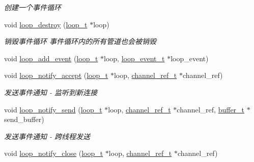\begin{DoxyCompactItemize}
\begin{DoxyCompactList}\small\item\em 创建一个事件循环 \end{DoxyCompactList}\item 
void \hyperlink{a00094_ga921fd5e5e16a73de123e81baab187a0a_ga921fd5e5e16a73de123e81baab187a0a}{loop\+\_\+destroy} (\hyperlink{a00047_a9c3ad1cd2de83e09f3a7b59fa82c94ee_a9c3ad1cd2de83e09f3a7b59fa82c94ee}{loop\+\_\+t} $\ast$loop)
\begin{DoxyCompactList}\small\item\em 销毁事件循环 事件循环内的所有管道也会被销毁 \end{DoxyCompactList}\item 
void \hyperlink{a00062_a1697e4a52238e6e4512caac6c34b9abb_a1697e4a52238e6e4512caac6c34b9abb}{loop\+\_\+add\+\_\+event} (\hyperlink{a00047_a9c3ad1cd2de83e09f3a7b59fa82c94ee_a9c3ad1cd2de83e09f3a7b59fa82c94ee}{loop\+\_\+t} $\ast$loop, \hyperlink{a00062_a1095ee772017ce29dcac0987c456709e_a1095ee772017ce29dcac0987c456709e}{loop\+\_\+event\+\_\+t} $\ast$loop\+\_\+event)
\item 
void \hyperlink{a00062_a61e9eb6eeaaad4d1d655beba05bb8440_a61e9eb6eeaaad4d1d655beba05bb8440}{loop\+\_\+notify\+\_\+accept} (\hyperlink{a00047_a9c3ad1cd2de83e09f3a7b59fa82c94ee_a9c3ad1cd2de83e09f3a7b59fa82c94ee}{loop\+\_\+t} $\ast$loop, \hyperlink{a00047_a151271c9d188ef28d4d24bb81dcc1263_a151271c9d188ef28d4d24bb81dcc1263}{channel\+\_\+ref\+\_\+t} $\ast$channel\+\_\+ref)
\begin{DoxyCompactList}\small\item\em 发送事件通知 -\/ 监听到新连接 \end{DoxyCompactList}\item 
void \hyperlink{a00062_ad023112870f736a601137129420a94b9_ad023112870f736a601137129420a94b9}{loop\+\_\+notify\+\_\+send} (\hyperlink{a00047_a9c3ad1cd2de83e09f3a7b59fa82c94ee_a9c3ad1cd2de83e09f3a7b59fa82c94ee}{loop\+\_\+t} $\ast$loop, \hyperlink{a00047_a151271c9d188ef28d4d24bb81dcc1263_a151271c9d188ef28d4d24bb81dcc1263}{channel\+\_\+ref\+\_\+t} $\ast$channel\+\_\+ref, \hyperlink{a00047_aad99a77d28bd81d3d36d0ea569c9482d_aad99a77d28bd81d3d36d0ea569c9482d}{buffer\+\_\+t} $\ast$send\+\_\+buffer)
\begin{DoxyCompactList}\small\item\em 发送事件通知 -\/ 跨线程发送 \end{DoxyCompactList}\item 
void \hyperlink{a00062_a6c9f3ec8e93c6e7b10ebb4dcaca562d4_a6c9f3ec8e93c6e7b10ebb4dcaca562d4}{loop\+\_\+notify\+\_\+close} (\hyperlink{a00047_a9c3ad1cd2de83e09f3a7b59fa82c94ee_a9c3ad1cd2de83e09f3a7b59fa82c94ee}{loop\+\_\+t} $\ast$loop, \hyperlink{a00047_a151271c9d188ef28d4d24bb81dcc1263_a151271c9d188ef28d4d24bb81dcc1263}{channel\+\_\+ref\+\_\+t} $\ast$channel\+\_\+ref)

\end{DoxyCompactItemize}
